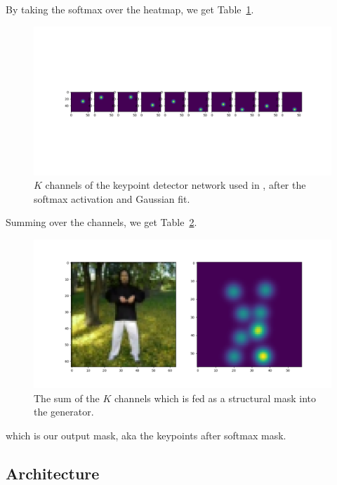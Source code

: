 \documentclass{article}
\begin{document}
By taking the softmax over the heatmap, we get Table~\ref{softmax-10kp}.
\begin{figure}[ht]
\vskip 0.2in
\begin{center}
\centerline{\includegraphics[width=\columnwidth]{visualizations/softmax_10kp}}
\caption{
$K$ channels of the keypoint detector network used in
\cite{siarohin2020order}, after the softmax activation and Gaussian fit.
}
\label{softmax-10kp}
\end{center}
\vskip -0.2in
\end{figure}

Summing over the channels, we get Table~\ref{softmax-sum}.

\begin{figure}[ht]
\vskip 0.2in
\begin{center}
\centerline{\includegraphics[width=\columnwidth]{visualizations/softmax_sumkp}}
\caption{
The sum of the $K$ channels which is fed as a structural mask into the
generator.
}
\label{softmax-sum}
\end{center}
\vskip -0.2in
\end{figure}
which is our output mask, aka the keypoints after softmax mask.

\subsection{Architecture}
\label{method}
\end{document}
